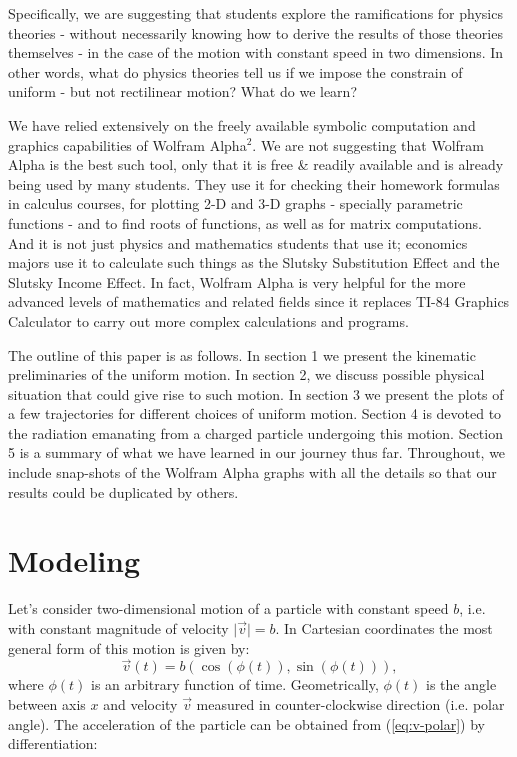 \documentclass[journal]{IEEEtran}
\begin{document}
Specifically, we are suggesting that students explore the ramifications for physics theories - without necessarily knowing how to derive the results of those theories themselves - in the case of the motion with constant speed in two dimensions.  In other words, what do physics theories tell us if we impose the constrain of uniform - but not rectilinear motion?  What do we learn?

We have relied extensively on the freely available symbolic computation and graphics capabilities of Wolfram Alpha$^2$.  We are not suggesting that Wolfram Alpha is the best such tool, only that it is free \& readily available and is already being used by many students. They use it for checking their homework formulas in calculus courses, for plotting 2-D and 3-D graphs - specially parametric functions - and to find roots of functions, as well as for matrix computations.  And it is not just physics and mathematics students that use it; economics majors use it to calculate such things as the Slutsky Substitution Effect and the Slutsky Income Effect.  In fact, Wolfram Alpha is very helpful for the more advanced levels of mathematics and related fields since it replaces TI-84 Graphics Calculator to carry out more complex calculations and programs.

The outline of this paper is as follows.  In section 1 we present the kinematic preliminaries of the uniform motion.  In section 2, we discuss possible physical situation that could give rise to such motion.  In section 3 we present the plots of a few trajectories for different choices of uniform motion.  Section 4 is devoted to the radiation emanating from a charged particle undergoing this motion.  Section 5 is a summary of what we have learned in our journey thus far.  Throughout, we include snap-shots of the Wolfram Alpha graphs with all the details so that our results could be duplicated by others.
\setcounter{secnumdepth}{1}
\section{\bf\large Modeling}
Let's consider two-dimensional motion of a particle with constant speed $b$, i.e. with constant magnitude of velocity $\vert\vec{v} \vert = b$. In Cartesian coordinates the most general form of this motion is given by:
\begin{equation}
\vec{v}(t)= b (\cos (\phi (t)), \sin (\phi (t)) ),
\label{eq:v-polar}
\end{equation}
where $\phi(t)$ is an arbitrary function of time. Geometrically, $\phi(t)$ is the angle between axis $x$ and velocity $\vec{v}$ measured in counter-clockwise direction (i.e. polar angle).
The acceleration of the particle can be obtained from (\ref{eq:v-polar}) by differentiation:
\end{document}
